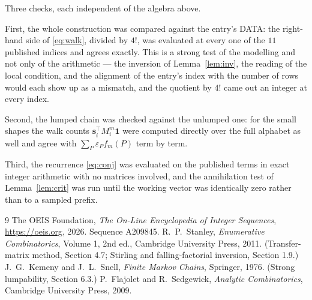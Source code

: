 \documentclass[11pt,a4paper]{article}
\theoremstyle{plain}
\theoremstyle{definition}
\begin{document}
Three checks, each independent of the algebra above.

First, the whole construction was compared against the entry's DATA: the right-hand side of
\eqref{eq:walk}, divided by $4!$, was evaluated at every one of the $11$
published indices and agrees exactly. This is a strong test of the modelling and not only of
the arithmetic --- the inversion of Lemma~\ref{lem:inv}, the reading of the local
condition, and the alignment of the entry's index with the number of rows would each
show up as a mismatch, and the quotient by $4!$ came out an integer at every index.

Second, the lumped chain was checked against the unlumped one: for the small shapes the walk
counts $\mathbf{s}_i^{\!\top}M_i^{m}\mathbf{1}$ were computed directly over the full
alphabet as well and agree with $\sum_P\varepsilon_Pf_m(P)$ term by term.

Third, the recurrence \eqref{eq:conj} was evaluated on the published terms in exact integer
arithmetic with no matrices involved, and the annihilation test of Lemma~\ref{lem:crit} was
run until the working vector was identically zero rather than to a sampled prefix.

\begin{thebibliography}{9}
 The OEIS Foundation, \emph{The On-Line Encyclopedia of Integer
Sequences}, \url{https://oeis.org}, 2026. Sequence A209845.
 R.~P.~Stanley, \emph{Enumerative Combinatorics}, Volume 1, 2nd ed.,
Cambridge University Press, 2011. (Transfer-matrix method, Section 4.7; Stirling and
falling-factorial inversion, Section 1.9.)
 J.~G.~Kemeny and J.~L.~Snell, \emph{Finite Markov Chains}, Springer,
1976. (Strong lumpability, Section 6.3.)
 P.~Flajolet and R.~Sedgewick, \emph{Analytic Combinatorics}, Cambridge
University Press, 2009.
\end{thebibliography}
\end{document}
